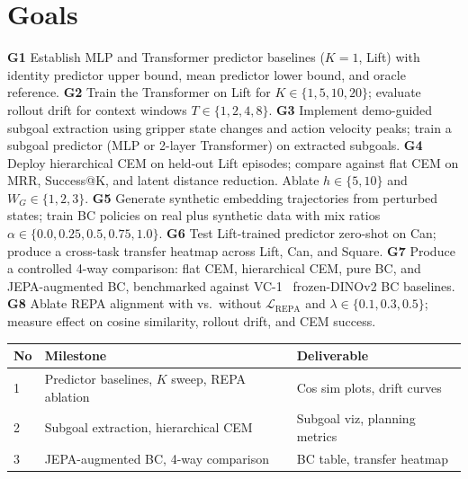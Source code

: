 \documentclass[10pt,twocolumn,letterpaper]{article}
\begin{document}
\section{Goals}

\noindent
\textbf{G1} Establish MLP and Transformer predictor baselines ($K{=}1$, Lift) with identity predictor upper bound, mean predictor lower bound, and oracle reference.
\textbf{G2} Train the Transformer on Lift for $K\!\in\!\{1,5,10,20\}$; evaluate rollout drift for context windows $T\!\in\!\{1,2,4,8\}$.
\textbf{G3} Implement demo-guided subgoal extraction using gripper state changes and action velocity peaks; train a subgoal predictor (MLP or 2-layer Transformer) on extracted subgoals.
\textbf{G4} Deploy hierarchical CEM on held-out Lift episodes; compare against flat CEM on MRR, Success@K, and latent distance reduction. Ablate $h\!\in\!\{5,10\}$ and $W_G\!\in\!\{1,2,3\}$.
\textbf{G5} Generate synthetic embedding trajectories from perturbed states; train BC policies on real plus synthetic data with mix ratios $\alpha\!\in\!\{0.0,0.25,0.5,0.75,1.0\}$.
\textbf{G6} Test Lift-trained predictor zero-shot on Can; produce a cross-task transfer heatmap across Lift, Can, and Square.
\textbf{G7} Produce a controlled 4-way comparison: flat CEM, hierarchical CEM, pure BC, and JEPA-augmented BC, benchmarked against VC-1~\cite{vc1} frozen-DINOv2 BC baselines.
\textbf{G8} Ablate REPA alignment with vs.\ without $\mathcal{L}_\text{REPA}$ and $\lambda\!\in\!\{0.1,0.3,0.5\}$; measure effect on cosine similarity, rollout drift, and CEM success.

\begin{table}[h]\centering\small\setlength{\tabcolsep}{3pt}
\begin{tabular}{@{}p{0.5cm}p{3.8cm}p{2.6cm}@{}}
\toprule
\textbf{No} & \textbf{Milestone} & \textbf{Deliverable}\\
\midrule
1 & Predictor baselines, $K$ sweep, REPA ablation & Cos sim plots, drift curves\\
2 & Subgoal extraction, hierarchical CEM & Subgoal viz, planning metrics\\
3 & JEPA-augmented BC, 4-way comparison & BC table, transfer heatmap\\
\bottomrule
\end{tabular}
\end{table}

\end{document}
